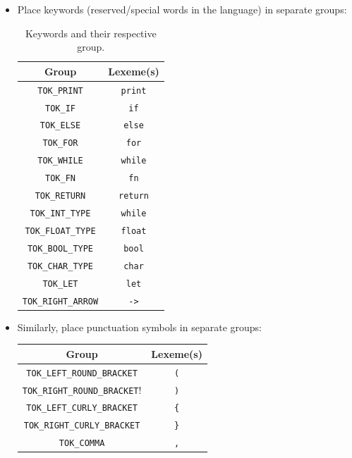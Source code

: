 \begin{itemize}
    \item Place keywords (reserved/special words in the language) in separate groups:
        \begin{table}[H]
        \scriptsize
        \centering
        \begin{tabular}{c c}
            Group & Lexeme(s) \\
            \hline
            \verb!TOK_PRINT! & \verb!print! \\
            \verb!TOK_IF! & \verb!if! \\
            \verb!TOK_ELSE! & \verb!else! \\
            \verb!TOK_FOR! & \verb!for! \\
            \verb!TOK_WHILE! & \verb!while! \\
            \verb!TOK_FN! & \verb!fn! \\
            \verb!TOK_RETURN! & \verb!return! \\
            \verb!TOK_INT_TYPE! & \verb !while! \\
            \verb!TOK_FLOAT_TYPE! & \verb!float! \\
            \verb!TOK_BOOL_TYPE! & \verb!bool! \\
            \verb!TOK_CHAR_TYPE! & \verb!char! \\
            \verb!TOK_LET! & \verb!let! \\
            \verb!TOK_RIGHT_ARROW! & \verb!->! \\
        \end{tabular}
        \caption{Keywords and their respective group.}
        \label{tab: keyword lexemes}
    \end{table}
    \item Similarly, place punctuation symbols in separate groups: 
    \begin{table}[H]
        \small
        \centering
        \begin{tabular}{c|c}
            Group & Lexeme(s) \\
            \hline
            \verb!TOK_LEFT_ROUND_BRACKET! & \verb!(! \\
            \verb!TOK_RIGHT_ROUND_BRACKET!! & \verb!)! \\
            \verb!TOK_LEFT_CURLY_BRACKET! & \verb!{! \\
            \verb!TOK_RIGHT_CURLY_BRACKET! & \verb!}! \\
            \verb!TOK_COMMA! & \verb!,! \\

\end{tabular}
\end{table}
\end{itemize}
